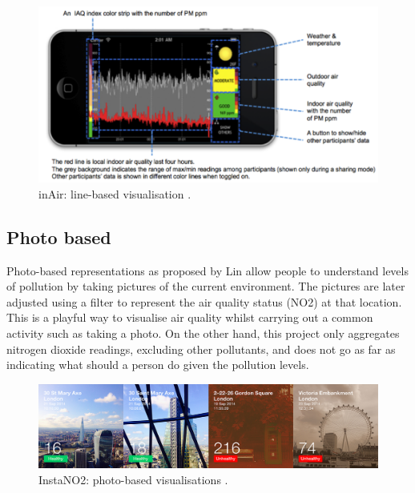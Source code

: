 \begin{figure}[H]
\begin{adjustbox}{width=1\textwidth,center=\textwidth}
  \centering
  \includegraphics[scale=1]{images/InAir.png}
\end{adjustbox}
  \caption[inAir project: line-based visualisations]{inAir: line-based visualisation \cite{Kim2013}.}
  \label{fig:line_based_inAir}
\end{figure}


\subsection{Photo based}
Photo-based representations as proposed by Lin \cite{Lin2014} allow people to understand levels of pollution by taking pictures of the current environment. The pictures are later adjusted using a filter to represent the air quality status (NO2) at that location. This is a playful way to visualise air quality whilst carrying out a common activity such as taking a photo. On the other hand, this project only aggregates nitrogen dioxide readings, excluding other pollutants, and does not go as far as indicating what should a person do given the pollution levels.

\begin{figure}[H]
\begin{adjustbox}{width=.8\textwidth,center=\textwidth}
  \centering
  \includegraphics[scale=.4]{images/instaNO2.jpg}
\end{adjustbox}
  \caption[InstaNO2 project: photo-based visualisations]{InstaNO2: photo-based visualisations \cite{Lin2014}.}
  \label{fig:photo_based_instaNO2}
\end{figure}

